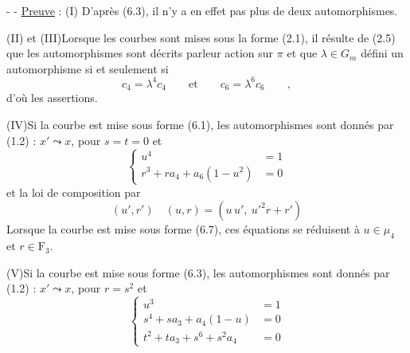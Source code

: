 -  -
\uline{Preuve} : (I) D'après (6.3), il n'y a en effet pas plus de deux automorphismes.

(II) et (III)\quad Lorsque les courbes sont mises sous la forme (2.1), il résulte de (2.5) que les automorphismes sont décrits parleur action sur $\pi$ et que $\lambda\in G_m$ défini un automorphisme si et seulement si
\[
c_4=\lambda^4c_4\qquad\text{et}\qquad c_6=\lambda^6c_6\qquad,
\]
d'où les assertions.

(IV)\quad Si la courbe est mise sous forme (6.1), les automorphismes sont donnés par (1.2) : $x'\leadsto x$, pour $s=t=0$ et
\[
\left\{\begin{aligned}
u^4&=1\\
r^3+ra_4+a_6(1-u^2)&=0
\end{aligned}\right.
\]
et la loi de composition par
\[
(u',r')\quad(u,r)=(u\,u',\ u'^2r+r')
\]
Lorsque la courbe est mise sous forme (6.7), ces équations se réduisent à $u\in\mu_4$ et $r\in\mathrm F_3$.

(V)\quad Si la courbe est mise sous forme (6.3), les automorphismes sont donnés par (1.2) : $x'\leadsto x$, pour $r=s^2$ et
\[
\left\{\begin{aligned}
u^3&=1\\
s^4+sa_3+a_4(1-u)&=0\\
t^2+ta_3+s^6+s^2a_4&=0
\end{aligned}\right.
\]

